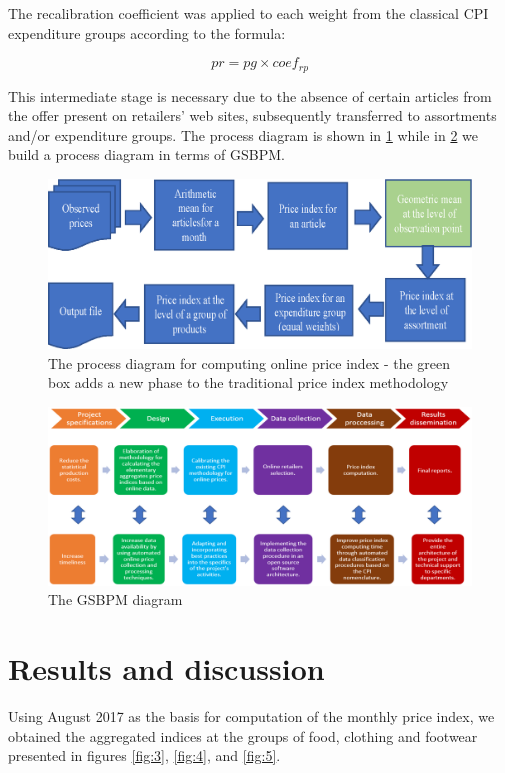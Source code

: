 \documentclass[]{article}
\begin{document}
The recalibration coefficient was applied to each weight from the classical CPI expenditure groups according to the formula:


\begin{equation}\label{eq:3}
pr = pg \times coef_{rp}
\end{equation}


This intermediate stage is necessary due to the absence of certain articles from the offer present on retailers' web sites, subsequently transferred to assortments and/or expenditure groups.
The process diagram is shown in \ref{fig:1} while in \ref{fig:2} we build a process diagram in terms of GSBPM.


\begin{figure}
\centering
\includegraphics[width=0.7\linewidth]{fig1.eps}
\caption{The process diagram for computing online price index - the green box adds a new phase to the traditional price index methodology}
\label{fig:1}
\end{figure}


\begin{figure}
\centering
\includegraphics[width=0.7\linewidth]{fig2.eps}
\caption{The GSBPM diagram}
\label{fig:2}
\end{figure}



\section{Results and discussion } \label{results}

Using August 2017 as the basis for computation of the monthly price index, we obtained the aggregated indices at the 
groups of food, clothing and footwear presented in figures \ref{fig:3}, \ref{fig:4}, and \ref{fig:5}.
\end{document}
